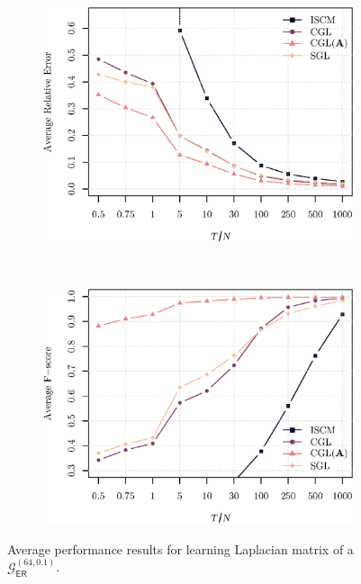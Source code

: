 \begin{figure}[!htb]
    \centering
    \begin{subfigure}[b]{0.47\textwidth}
      \includegraphics[width=\textwidth]{erdos-renyi/latex/figures/relative_error_erdos_renyi.eps}
    \end{subfigure}
    ~ %
    \begin{subfigure}[b]{0.47\textwidth}
        \includegraphics[width=\textwidth]{erdos-renyi/latex/figures/fscore_erdos_renyi.eps}
    \end{subfigure}
    \caption{Average performance results for learning Laplacian matrix of a $\mathcal{G}^{(64, 0.1)}_{\mathsf{ER}}$.}
    \label{fig:performance-erdos-renyi}
\end{figure}

